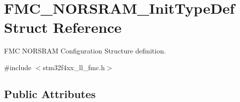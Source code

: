 \hypertarget{struct_f_m_c___n_o_r_s_r_a_m___init_type_def}{}\section{F\+M\+C\+\_\+\+N\+O\+R\+S\+R\+A\+M\+\_\+\+Init\+Type\+Def Struct Reference}
\label{struct_f_m_c___n_o_r_s_r_a_m___init_type_def}


F\+MC N\+O\+R\+S\+R\+AM Configuration Structure definition.  




{\ttfamily \#include $<$stm32f4xx\+\_\+ll\+\_\+fmc.\+h$>$}

\subsection*{Public Attributes}
